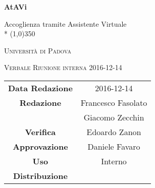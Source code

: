 \documentclass[a4paper,12pt]{article}
\author{Nome Autore}
\date{2016/12/14}
\begin{document}
\begin{titlepage}  
	\centering
	{\huge\bfseries AtAVi\par}
	Accoglienza tramite Assistente Virtuale \\*
	\line(1,0){350} \\
	{\scshape\LARGE Università di Padova \par}
	\vspace{1cm}
	{\scshape\Large Verbale Riunione interna 2016-12-14\par}
	\vspace{1.5cm}
	\logo
	\vspace{2cm}	
	\vfill \vfill
	\begin{tabular}{c|c}
		{\hfill\textbf{Data Redazione}} 		& 2016-12-14		\\
		{\hfill\textbf{Redazione}} 			& Francesco Fasolato\\ & Giacomo Zecchin \\
		{\hfill\textbf{Verifica}} 				& Edoardo Zanon 	\\
		{\hfill\textbf{Approvazione}} 				& Daniele Favaro 	\\
		{\hfill\textbf{Uso}} 					& Interno			\\
		{\hfill\textbf{Distribuzione}} 		& \kpanic\			\\
	\end{tabular}
\end{titlepage}

	\pagestyle{myfront}
	\newpage
	\tableofcontents
	
	\label{LastFrontPage}
	\newpage	
	\pagestyle{mymain}		
		
		
		
		
		
		
		
	
	\label{LastPage}
\end{document}
